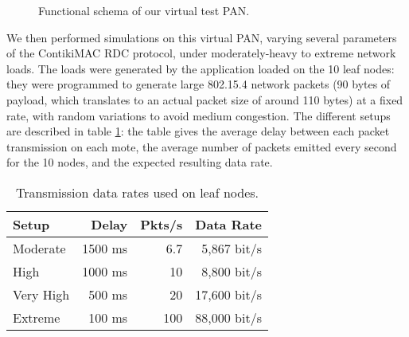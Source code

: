 \documentclass[a4paper,twoside]{article}
\begin{document}
\begin{figure}[!h]
\centering
{}
\caption{Functional schema of our virtual test PAN.}
\label{FigPANtest}
\end{figure}

We then performed simulations on this virtual PAN, varying several parameters
of the ContikiMAC RDC protocol, under moderately-heavy to extreme network
loads. The loads were generated by the application loaded on the 10 leaf
nodes: they were programmed to generate large 802.15.4 network packets
(90 bytes of payload, which translates to an actual packet size of
around 110 bytes) at a fixed rate, with random variations to avoid
medium congestion. The different setups are described in table
\ref{TblDataRates}: the table gives the average delay between
each packet transmission on each mote, the average number of
packets emitted every second for the 10 nodes, and the expected
resulting data rate.

\begin{table}[htb]
\centering
\begin{tabular}{|l|r|r|r|}
\hline
Setup     &  Delay  & Pkts/s & Data Rate \\
\hline
Moderate  & 1500 ms &   6.7  &  5,867 bit/s \\ 
High      & 1000 ms &  10    &  8,800 bit/s \\
Very High &  500 ms &  20    & 17,600 bit/s \\
Extreme   &  100 ms & 100    & 88,000 bit/s \\
\hline
\end{tabular}
\caption{Transmission data rates used on leaf nodes.}
\label{TblDataRates}
\end{table}
\end{document}
